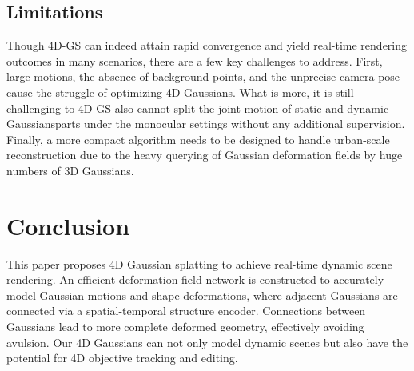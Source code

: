 
\subsection{Limitations}
\label{Subsec:limitation}
Though 4D-GS can indeed attain rapid convergence and yield real-time rendering outcomes in many scenarios, there are a few key challenges to address. First, large motions, the absence of background points, and the unprecise camera pose cause the struggle of optimizing 4D Gaussians. What is more, it is still challenging to 4D-GS also cannot split the joint motion of static and dynamic Gaussiansparts under the monocular settings without any additional supervision. Finally, a more compact algorithm needs to be designed to handle urban-scale reconstruction due to the heavy querying of Gaussian deformation fields by huge numbers of 3D Gaussians. 

\section{Conclusion}
This paper proposes 4D Gaussian splatting to achieve real-time dynamic scene rendering. An efficient deformation field network is constructed to accurately model Gaussian motions and shape deformations, where adjacent Gaussians are connected via a spatial-temporal structure encoder. Connections between Gaussians lead to more complete deformed geometry, effectively avoiding avulsion. Our 4D Gaussians can not only model dynamic scenes but also have the potential for 4D objective tracking and editing.









